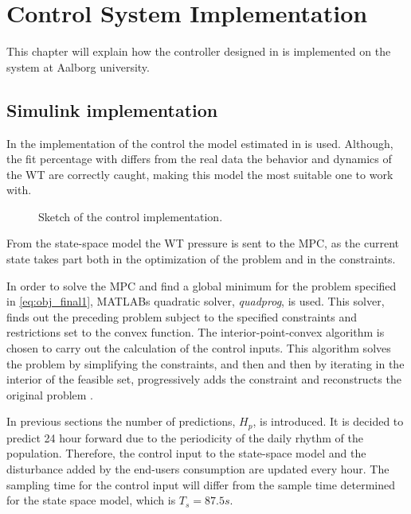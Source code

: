 \chapter{Control System Implementation}
\label{implementation_of_controller}

This chapter will explain how the controller designed in  is implemented on the system at Aalborg university.  

\section{Simulink implementation}
\label{simulink_intro}
In the implementation of the control the model estimated in  is used. Although, the fit percentage with differs from the real data the behavior and dynamics of the WT are correctly caught, making this model the most suitable one to work with. 

\begin{figure}[H]
\centering
 
\caption{Sketch of the control implementation.}
\label{fig:control_sketch}
\end{figure}

From the state-space model the WT pressure is sent to the MPC, as the current state takes part both in the optimization of the problem and in the constraints.

In order to solve the MPC and find a global minimum for the problem specified in \eqref{eq:obj_final1},  MATLABs quadratic solver, \textit{quadprog}, is used. This solver, finds out the preceding problem subject to the specified constraints and restrictions set to the convex function. The interior-point-convex algorithm is chosen to carry out the calculation of the control inputs. This algorithm solves the problem by simplifying the constraints, and then and then by iterating in the interior of the feasible set, progressively adds the constraint and reconstructs the original problem \cite{Convex_optimization}. 



In previous sections the number of predictions, $H_p$, is introduced. It is decided to predict 24 hour forward due to the periodicity of the daily rhythm of the population. Therefore, the control input to the state-space model and the disturbance added by the end-users consumption are updated every hour. The sampling time for the control input will differ from the sample time determined for the state space model, which is $T_s = 87.5s$. 


